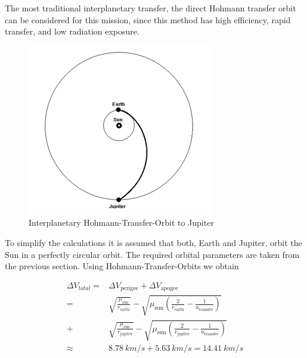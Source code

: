 

The most traditional interplanetary transfer, the direct Hohmann
transfer orbit can be considered for this mission, since this method
has high efficiency, rapid transfer, and low radiation
exposure.\cite{Wertz2011SpaceMissionEng}

\begin{figure}[H]
  \includegraphics[width=\textwidth]{Hohmann-Orbit}
  \caption{Interplanetary Hohmann-Transfer-Orbit to Jupiter}
\end{figure}

To simplify the calculations it is assumed that both, Earth and
Jupiter, orbit the Sun in a perfectly circular orbit.  The required
orbital parameters are taken from the previous section.  Using
Hohmann-Transfer-Orbits we obtain

\begin{align*}
  \Delta V_{total} = {} &
  \Delta V_{\mathrm{perigee}}
  + \Delta V_{\mathrm{apogee}} \\
  = {} & \sqrt{\frac{\mu_{\mathrm{sun}}}{r_{\mathrm{earth}}}}
  - \sqrt{\mu_{\mathrm{sun}} \left(\frac{2}{r_{\mathrm{earth}}}
    - \frac{1}{a_{\mathrm{transfer}}}\right)} \\
  + & \sqrt{\frac{\mu_{\mathrm{sun}}}{r_{\mathrm{jupiter}}}}
  - \sqrt{\mu_{\mathrm{sun}}\left(\frac{2}{r_{\mathrm{jupiter}}}
    - \frac{1}{a_{\mathrm{transfer}}}\right)} \\
  \approx {} & \SI{8.78}{km/s} + \SI{5.63}{km/s} = \SI{14.41}{km/s} \\
\end{align*}

